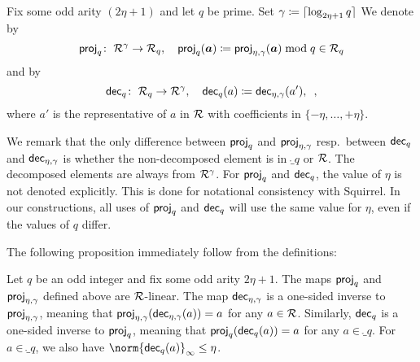 %
\begin{definition}
Fix some odd arity $(2\eta+1)$ and let $q$ be prime.
Set $\gamma \coloneqq \lceil\log_{2\eta+1}q\rceil$
We denote by
\[
 \mathsf{proj}_{q}\colon\;\mathcal{R}^\gamma \to \mathcal{R}_q,\quad \mathsf{proj}_{q}(\boldsymbol{a}) \coloneqq \mathsf{proj}_{\eta,\gamma}(\boldsymbol{a})\bmod q\in\mathcal{R}_q
\]
and by
\[
 \mathsf{dec}_{q}\colon\;\mathcal{R}_q \to \mathcal{R}^\gamma,\quad \mathsf{dec}_{q}(a) \coloneqq \mathsf{dec}_{\eta,\gamma}(a'),\enspace,
\]
where $a'$ is the representative of $a$ in $\mathcal{R}$ with coefficients in $\{-\eta,\ldots,+\eta\}$.
\end{definition}
We remark that the only difference between $\mathsf{proj}_{q}$ and $\mathsf{proj}_{\eta,\gamma}$ resp.\ between $\mathsf{dec}_{q}$ and $\mathsf{dec}_{\eta,\gamma}$ is whether the non-decomposed element is in $\ring_q$ or $\mathcal{R}$.
The decomposed elements are always from $\mathcal{R}^\gamma$.
For $\mathsf{proj}_{q}$ and $\mathsf{dec}_{q}$, the value of $\eta$ is not denoted explicitly.
This is done for notational consistency with Squirrel.
In our constructions, all uses of $\mathsf{proj}_{q}$ and $\mathsf{dec}_{q}$ will use the same value for $\eta$, even if the values of $q$ differ.


The following proposition immediately follow from the definitions:
\begin{proposition}\label{prop:projanddecomp}
Let $q$ be an odd integer and fix some odd arity $2\eta+1$. The maps $\mathsf{proj}_{q}$ and $\mathsf{proj}_{\eta,\gamma}$ defined above are $\mathcal{R}$-linear.
The map $\mathsf{dec}_{\eta,\gamma}$ is a one-sided inverse to $\mathsf{proj}_{\eta,\gamma}$, meaning that $\mathsf{proj}_{\eta,\gamma}(\mathsf{dec}_{\eta,\gamma}(a)) = a$ for any $a\in\mathcal{R}$.
Similarly, $\mathsf{dec}_{q}$ is a one-sided inverse to $\mathsf{proj}_{q}$, meaning that $\mathsf{proj}_{q}(\mathsf{dec}_{q}(a))= a$ for any $a\in\ring_q$.
For $a\in\ring_q$, we also have $\norm{\decompmod{q}(a)}_{\infty} \leq \eta$.
\end{proposition}

